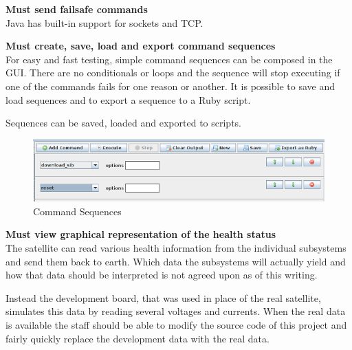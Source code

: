 \textbf{Must send failsafe commands} \\
Java has built-in support for sockets and TCP.

\textbf{Must create, save, load and export command sequences} \\
For easy and fast testing, simple command sequences can be composed in the GUI. There are no conditionals or loops and the sequence will stop executing if one of the commands fails for one reason or another. It is possible to save and load sequences and to export a sequence to a Ruby script.

Sequences can be saved, loaded and exported to scripts.

\begin{figure}[h!] \centering
	\includegraphics[scale=0.7]{img/fsgui_sequences}
  \caption{Command Sequences}
\end{figure}

\textbf{Must view graphical representation of the health status} \\
The satellite can read various health information from the individual subsystems and send them back to earth. Which data the subsystems will actually yield and how that data should be interpreted is not agreed upon as of this writing.

Instead the development board, that was used in place of the real satellite, simulates this data by reading several voltages and currents. When the real data is available the staff should be able to modify the source code of this project and fairly quickly replace the development data with the real data.

